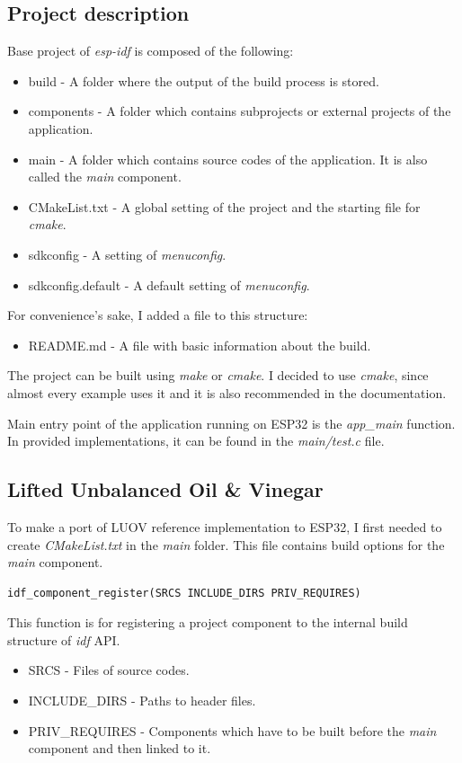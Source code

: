 \documentclass[thesis=M,english]{FITthesis}[2019/12/23]
\begin{document}
\subsection{Project description}
Base project of \textit{esp-idf} is composed of the following:
\begin{itemize}
\item	build - A folder where the output of the build process is stored.
\item	components - A folder which contains subprojects or external projects of the application.
\item	main - A folder which contains source codes of the application. It is also called the \textit{main} component.
\item	CMakeList.txt - A global setting of the project and the starting file for \textit{cmake}.
\item	sdkconfig - A setting of \textit{menuconfig}.
\item	sdkconfig.default - A default setting of \textit{menuconfig}.
\end{itemize}
For convenience’s sake, I added a file to this structure:
\begin{itemize}
\item	README.md - A file with basic information about the build.
\end{itemize}

\noindent
The project can be built using \textit{make} or \textit{cmake}. I decided to use \textit{cmake}, since almost every example uses it and it is also recommended in the documentation. 

\bigskip
\noindent
Main entry point of the application running on ESP32 is the \textit{app\_main} function. In provided implementations, it can be found in the \textit{main/test.c} file.

\subsection{Lifted Unbalanced Oil \& Vinegar} \label{esp-luov-make}
To make a port of LUOV reference implementation to ESP32, I first needed to create \textit{CMakeList.txt} in the \textit{main} folder. This file contains build options for the \textit{main} component.
\begin{lstlisting}[frame=single]
idf_component_register(SRCS INCLUDE_DIRS PRIV_REQUIRES)
\end{lstlisting}
This function is for registering a project component to the internal build structure of \textit{idf} API.
\begin{itemize}
\item	SRCS - Files of source codes.
\item	INCLUDE\_DIRS - Paths to header files.
\item	PRIV\_REQUIRES - Components which have to be built before the \textit{main} component and then linked to it.
\end{itemize}
\end{document}
